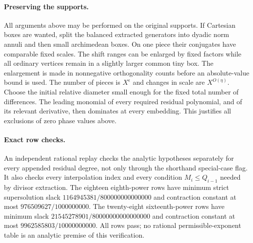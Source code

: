 \documentclass[11pt,reqno]{amsart}
\numberwithin{equation}{section}
\theoremstyle{definition}
\begin{document}
\paragraph{Preserving the supports.}
All arguments above may be performed on the original supports.  If
Cartesian boxes are wanted, split the balanced extracted generators into
dyadic norm annuli and then small archimedean boxes.  On one piece their
conjugates have comparable fixed scales.  The shift ranges can be enlarged
by fixed factors while all ordinary vertices remain in a slightly larger
common tiny box.  The enlargement is made in nonnegative orthogonality
counts before an absolute-value bound is used.  The number of pieces is
$X^\epsilon$ and changes in scale are $X^{O(\eta)}$.
Choose the initial relative diameter small enough for the fixed total
number of differences.  The leading monomial of every required residual
polynomial, and of its relevant derivative, then dominates at every
embedding.  This justifies all exclusions of zero phase values above.

\paragraph{Exact row checks.}
An independent rational replay checks the analytic hypotheses separately
for every appended residual degree, not only through the shorthand
special-case flag.  It also checks every interpolation index and every
condition $M_i\le Q_{i-1}$ needed by divisor extraction.
The eighteen eighth-power rows have minimum strict supersolution slack
$1164945381/800000000000000$ and contraction constant at most
$976509627/1000000000$.
The twenty-eight sixteenth-power rows have minimum slack
$21545278901/80000000000000000$ and contraction constant at most
$9962585803/10000000000$.
All rows pass; no rational permissible-exponent table is an analytic
premise of this verification.
\end{document}
